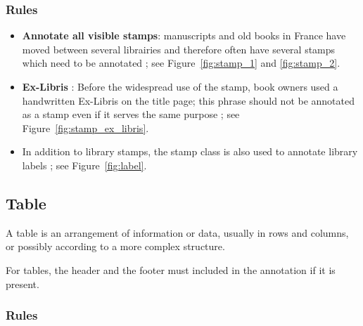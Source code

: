 \subsubsection{Rules}

\begin{itemize}
  \item \textbf{Annotate all visible stamps}: manuscripts and old books in France have moved between several librairies and therefore often have several stamps which need to be annotated ; see Figure~\ref{fig:stamp_1} and \ref{fig:stamp_2}.

  \item \textbf{Ex-Libris }: Before the widespread use of the stamp, book owners used a handwritten Ex-Libris on the title page; this phrase should not be annotated as a stamp even if it serves the same purpose ; see Figure~\ref{fig:stamp_ex_libris}.

  \item In addition to library stamps, the stamp class is also used to annotate library labels ; see Figure~\ref{fig:label}.
\end{itemize}

\subsection{Table}

A table is an arrangement of information or data, usually in rows and columns, or possibly according to a more complex structure. 

For tables, the header and the footer must included in the annotation if it is present. 

\subsubsection{Rules}

